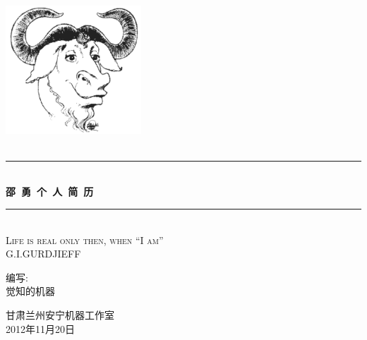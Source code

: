

\newcommand{\HRule}{\rule{\linewidth}{0.5mm}}
\newenvironment{shell}{\footnotesize{}\linespread{0.9}\begin{shaded}}{\end{shaded}\linespread{1.0}\normalsize{}}

\setlength{\parindent}{2em}
\setlength{\fboxrule}{1pt}
\setlength{\fboxsep}{5pt}

\pagestyle{fancy}
\rfoot{\thepage} 
\renewcommand{\headrulewidth}{0.4pt} 
\renewcommand{\footrulewidth}{0.4pt}

\begin{titlepage}
  \begin{center}
    \includegraphics[width=2in]{images/gnu-head}
    \textsc{\LARGE }\\[1.5cm]
    \textsc{\Large }\\[0.5cm]

    \HRule \\[0.4cm]
    {\huge \bfseries 邵\ 勇\ 个\ 人\ 简\ 历 }\\[0.4cm]
    \HRule \\[1.0cm]
    \textsc{\large Life is real only then, when ``I am''\\
      \quad{}G.I.GURDJIEFF}\\[2.0cm]

    \begin{minipage}{0.4\textwidth}
      \begin{center} \large
        编\quad{}写:\\
        觉知的机器
      \end{center}
    \end{minipage}

    \vfill
    {\large 甘肃兰州安宁机器工作室}\\ 
    {\large 2012年11月20日}
  \end{center}
\end{titlepage}

